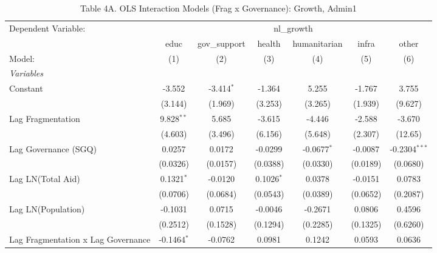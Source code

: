 \begin{table}[H]
   \caption{Table 4A. OLS Interaction Models (Frag x Governance): Growth, Admin1}
   \centering
   \begin{tabular}{lcccccc}
      \tabularnewline \midrule \midrule
      Dependent Variable: & \multicolumn{6}{c}{nl\_growth}\\
                                         & educ          & gov\_support  & health       & humanitarian  & infra    & other \\   
      Model:                             & (1)           & (2)           & (3)          & (4)           & (5)      & (6)\\  
      \midrule
      \emph{Variables}\\
      Constant                           & -3.552        & -3.414$^{*}$  & -1.364       & 5.255         & -1.767   & 3.755\\   
                                         & (3.144)       & (1.969)       & (3.253)      & (3.265)       & (1.939)  & (9.627)\\   
      Lag Fragmentation                  & 9.828$^{**}$  & 5.685         & -3.615       & -4.446        & -2.588   & -3.670\\   
                                         & (4.603)       & (3.496)       & (6.156)      & (5.648)       & (2.307)  & (12.65)\\   
      Lag Governance (SGQ)               & 0.0257        & 0.0172        & -0.0299      & -0.0677$^{*}$ & -0.0087  & -0.2304$^{***}$\\   
                                         & (0.0326)      & (0.0157)      & (0.0388)     & (0.0330)      & (0.0189) & (0.0680)\\   
      Lag LN(Total Aid)                  & 0.1321$^{*}$  & -0.0120       & 0.1026$^{*}$ & 0.0378        & -0.0151  & 0.0783\\   
                                         & (0.0706)      & (0.0684)      & (0.0543)     & (0.0389)      & (0.0652) & (0.2087)\\   
      Lag LN(Population)                 & -0.1031       & 0.0715        & -0.0046      & -0.2671       & 0.0806   & 0.4596\\   
                                         & (0.2512)      & (0.1528)      & (0.1294)     & (0.2285)      & (0.1325) & (0.6260)\\   
      Lag Fragmentation x Lag Governance & -0.1464$^{*}$ & -0.0762       & 0.0981       & 0.1242        & 0.0593   & 0.0636\\   

\end{tabular}
\end{table}
